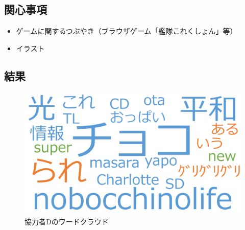 \subsection{関心事項}
\begin{itemize}
	\item ゲームに関するつぶやき（ブラウザゲーム「艦隊これくしょん」等）
	\item イラスト
\end{itemize}

\subsection{結果}

\begin{figure}[H]
\centering
\includegraphics[width=13cm]{shimada_cloud.png}
\caption{協力者Dのワードクラウド}\label{shimadacloud}
\end{figure}

